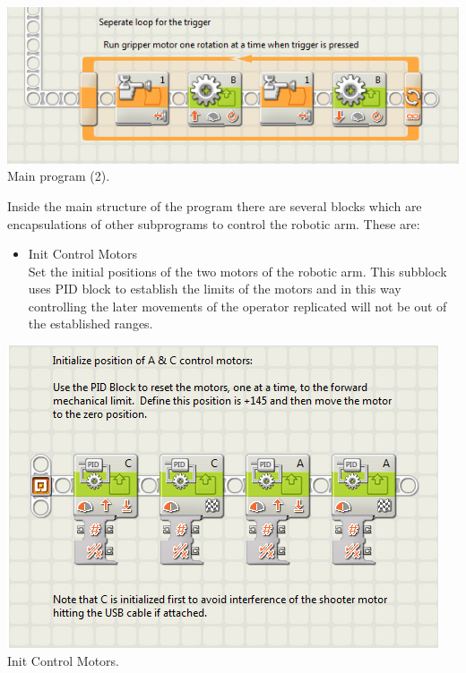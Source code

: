 \documentclass[a4paper,11pt]{article}
\begin{document}
			\begin{center}
				\includegraphics[scale=0.8]{img/SW_main2.png}\\
				Main program (2).
			\end{center}

	\begin{multicols}{2}

			Inside the main structure of the program there are several blocks which are encapsulations of other subprograms to control the robotic arm. These are:\\

			\begin{itemize}
				\item Init Control Motors\\
				
				Set the initial positions of the two motors of the robotic arm. This subblock uses PID block to establish the limits of the motors and in this way controlling the later movements of the operator replicated will not be out of the established ranges.
			\end{itemize}

	\end{multicols}

			\begin{center}
				\includegraphics[scale=0.8]{img/SW_InitControlMotors.png}\\
				Init Control Motors.
			\end{center}
\end{document}
